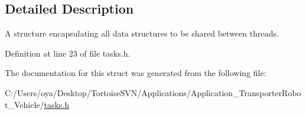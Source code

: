 \subsection{Detailed Description}
A structure encapsulating all data structures to be shared between threads. 

Definition at line 23 of file tasks.\+h.



The documentation for this struct was generated from the following file\+:\begin{DoxyCompactItemize}
\item 
C\+:/\+Users/oya/\+Desktop/\+Tortoise\+S\+V\+N/\+Applications/\+Application\+\_\+\+Transporter\+Robot\+\_\+\+Vehicle/\mbox{\hyperlink{tasks_8h}{tasks.\+h}}\end{DoxyCompactItemize}
